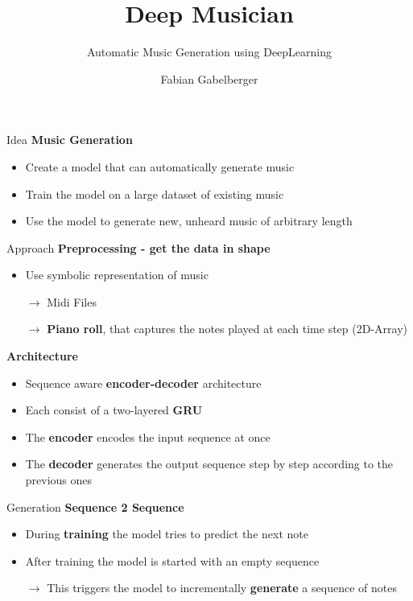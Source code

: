 \documentclass[xcolor={dvipsnames},12pt]{beamer}
\title{Deep Musician}
\subtitle{Automatic Music Generation using DeepLearning}
\author{Fabian Gabelberger}
\begin{document}
\maketitle

\begin{frame}{Idea}
    \textbf{Music Generation}
    \begin{itemize}
        \setlength\itemsep{1em}
        \item Create a model that can automatically generate music
        \item Train the model on a large dataset of existing music
        \item Use the model to generate new, unheard music of arbitrary length
    \end{itemize}
\end{frame}

\begin{frame}{Approach}
    \textbf{Preprocessing - get the data in shape}
    \begin{itemize}
        \item Use symbolic representation of music
        \item[$\rightarrow$] Midi Files
        \item[$\rightarrow$] \textbf{Piano roll}, that captures the
            notes played at each time step (2D-Array)
    \end{itemize}

    \textbf{Architecture}
    \begin{itemize}
        \item Sequence aware \textbf{encoder-decoder} architecture
        \item Each consist of a two-layered \textbf{GRU}
        \item The \textbf{encoder} encodes the input sequence at once
        \item The \textbf{decoder} generates the output sequence step by step according
              to the previous ones
    \end{itemize}
\end{frame}

\begin{frame}{Generation}
    \textbf{Sequence 2 Sequence}
    \begin{itemize}
        \item During \textbf{training} the model tries to predict the next note
        \item After training the model is started with an empty sequence
        \item[$\rightarrow$] This triggers the model to incrementally
            \textbf{generate}
            a sequence of notes
    \end{itemize}
\end{frame}
\end{document}
